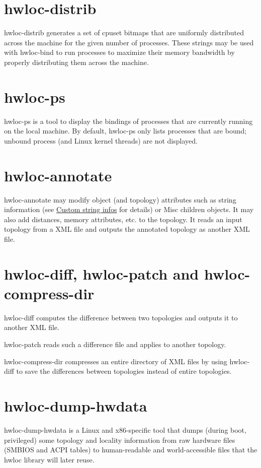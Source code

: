  \hypertarget{a00381_cli_hwloc_distrib}{}\section{hwloc-\/distrib}\label{a00381_cli_hwloc_distrib}
hwloc-\/distrib generates a set of cpuset bitmaps that are uniformly distributed across the machine for the given number of processes. These strings may be used with hwloc-\/bind to run processes to maximize their memory bandwidth by properly distributing them across the machine.

 \hypertarget{a00381_cli_hwloc_ps}{}\section{hwloc-\/ps}\label{a00381_cli_hwloc_ps}
hwloc-\/ps is a tool to display the bindings of processes that are currently running on the local machine. By default, hwloc-\/ps only lists processes that are bound; unbound process (and Linux kernel threads) are not displayed.

 \hypertarget{a00381_cli_hwloc_annotate}{}\section{hwloc-\/annotate}\label{a00381_cli_hwloc_annotate}
hwloc-\/annotate may modify object (and topology) attributes such as string information (see \hyperlink{a00386_attributes_info}{Custom string infos} for details) or Misc children objects. It may also add distances, memory attributes, etc. to the topology. It reads an input topology from a X\+ML file and outputs the annotated topology as another X\+ML file.

 \hypertarget{a00381_cli_hwloc_diffpatchcompress}{}\section{hwloc-\/diff, hwloc-\/patch and hwloc-\/compress-\/dir}\label{a00381_cli_hwloc_diffpatchcompress}
hwloc-\/diff computes the difference between two topologies and outputs it to another X\+ML file.

hwloc-\/patch reads such a difference file and applies to another topology.

hwloc-\/compress-\/dir compresses an entire directory of X\+ML files by using hwloc-\/diff to save the differences between topologies instead of entire topologies.

 \hypertarget{a00381_cli_hwloc_dump_hwdata}{}\section{hwloc-\/dump-\/hwdata}\label{a00381_cli_hwloc_dump_hwdata}
hwloc-\/dump-\/hwdata is a Linux and x86-\/specific tool that dumps (during boot, privileged) some topology and locality information from raw hardware files (S\+M\+B\+I\+OS and A\+C\+PI tables) to human-\/readable and world-\/accessible files that the hwloc library will later reuse.

